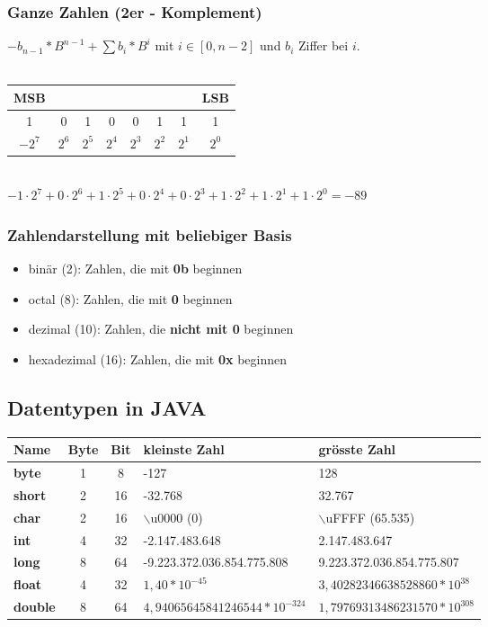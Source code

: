 \documentclass[a4paper,10pt]{article}
\newcommand{\Bold}[1]{\textbf{#1}} %
\begin{document}
\subsubsection{Ganze Zahlen (2er - Komplement)}
$-b_{n-1}*B^{n-1}+\sum b_i*B^i$ mit $i \in [0,n-2]$ und  $b_i$ Ziffer bei $i$.\\\\
\begin{tabular}{|c|c|c|c|c|c|c|c|}
\multicolumn{1}{c}{MSB}&\multicolumn{6}{c}{}&\multicolumn{1}{c}{LSB}\\ \hline
1&0&1&0&0&1&1&1\\\hline
\multicolumn{1}{c}{$-2^7$}&\multicolumn{1}{c}{$2^6$}&\multicolumn{1}{c}{$2^5$}&\multicolumn{1}{c}{$2^4$}&\multicolumn{1}{c}{$2^3$}&\multicolumn{1}{c}{$2^2$}&\multicolumn{1}{c}{$2^1$}&\multicolumn{1}{c}{$2^0$}\\
\end{tabular}\\
$-1\cdot 2^7+0\cdot 2^6+1\cdot 2^5+0\cdot 2^4+0\cdot 2^3+1\cdot 2^2+1\cdot 2^1+1\cdot 2^0=-89$\\
\subsubsection{Zahlendarstellung mit beliebiger Basis}
\begin{itemize}
\item bin\"ar (2): Zahlen, die mit \Bold{0b} beginnen
\item octal (8): Zahlen, die mit \Bold{0} beginnen
\item dezimal (10): Zahlen, die \Bold{nicht mit 0} beginnen
\item  hexadezimal (16): Zahlen, die mit \Bold{0x} beginnen
\end{itemize}

\subsection{Datentypen in JAVA}
\begin{tabular}{l c c l l}
	Name & Byte & Bit & kleinste Zahl & gr\"osste Zahl \\
	\hline
	\Bold {byte} & 1 & 8 & -127 & 128 \\
	\Bold {short} & 2 & 16 &-32.768 & 32.767 \\
	\Bold {char} & 2 & 16 & $\backslash$u0000 (0) & 	$\backslash$uFFFF (65.535) \\
	\Bold {int} & 4 & 32 & -2.147.483.648 & 2.147.483.647 \\
	\Bold {long} & 8 & 64 & -9.223.372.036.854.775.808 & 9.223.372.036.854.775.807 \\
	\Bold {float} & 4 & 32 & $1,40 * 10^{-45}$ & $3,40282346638528860 * 10^{38}$ \\
	\Bold {double} & 8 & 64 & $4,94065645841246544*10^{-324}$ & $1,79769313486231570*10^{308}$  \\
\end{tabular}
\end{document}
